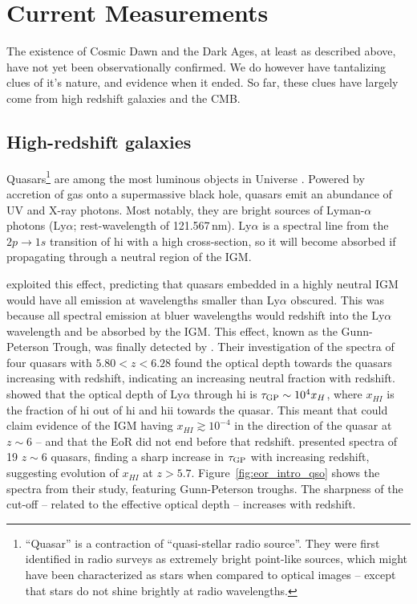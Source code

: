\section{Current Measurements}
\label{sec:eor_intro_current}

The existence of Cosmic Dawn and the Dark Ages, at least as described above, have not yet been observationally confirmed. We do however have tantalizing clues of it's nature, and evidence when it ended. So far, these clues have largely come from high redshift galaxies and the CMB.

\subsection{High-redshift galaxies}

Quasars\footnote{``Quasar'' is a contraction of ``quasi-stellar radio source''. They were first identified in radio surveys as extremely bright point-like sources, which might have been characterized as stars when compared to optical images -- except that stars do not shine brightly at radio wavelengths.} are among the most luminous objects in Universe \citep[e.g.][]{Manti.17}. Powered by accretion of gas onto a supermassive black hole, quasars emit an abundance of UV and X-ray photons. Most notably, they are bright sources of Lyman-$\alpha$ photons (Ly$\alpha$; rest-wavelength of 121.567\,nm). Ly$\alpha$ is a spectral line from the $2p \rightarrow 1s$ transition of {\sc hi} with a high cross-section, so it will become absorbed if propagating through a neutral region of the IGM. 

\cite{Gunn.65} exploited this effect, predicting that quasars embedded in a highly neutral IGM would have all emission at wavelengths smaller than Ly$\alpha$ obscured. This was because all spectral emission at bluer wavelengths would redshift into the Ly$\alpha$ wavelength and be absorbed by the IGM. This effect, known as the Gunn-Peterson Trough, was finally detected by \cite{Becker.01}. Their investigation of the spectra of four quasars with $5.80<z<6.28$ found the optical depth towards the quasars increasing with redshift, indicating an increasing neutral fraction with redshift. \cite{Gunn.65} showed that the optical depth of Ly$\alpha$ through {\sc hi} is $\tau_{\rm GP}\sim10^4x_H$, where $x_{HI}$ is the fraction of {\sc hi} out of {\sc hi} and {\sc hii} towards the quasar. This meant that \cite{Becker.01} could claim evidence of the IGM having $x_{HI}\gtrsim10^{-4}$ in the direction of the quasar at $z\sim6$ -- and that the EoR did not end before that redshift. \cite{Fan.06.2} presented spectra of 19 $z\sim 6$ quasars, finding a sharp increase in $\tau_{\rm GP}$ with increasing redshift, suggesting evolution of $x_{HI}$ at $z>5.7$. Figure~\ref{fig:eor_intro_qso} shows the spectra from their study, featuring Gunn-Peterson troughs. The sharpness of the cut-off -- related to the effective optical depth -- increases with redshift.


